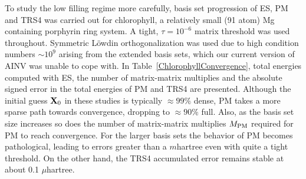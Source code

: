 \commentoutA{\documentclass[prl,aps,twocolumn,showpacs,twocolumngrid,superbib]{revtex4}}
\begin{document}
To study the low filling regime more carefully, basis set progression of ES, PM 
and TRS4 was carried out for chlorophyll, a relatively small (91 atom) Mg containing porphyrin ring system. 
A tight,  $\tau=10^{-6}$ matrix threshold was used throughout.  Symmetric L\"owdin orthogonalization 
was used due to high condition numbers $\sim 10^9$ arising from the extended basis sets, which 
our current version of AINV was unable to cope with.  In Table~\ref{ChlorophyllConvergence}, 
total energies computed with ES, the number of matrix-matrix multiplies and the absolute signed 
error in the total energies of PM and TRS4 are presented.  Although the initial guess ${\bf X}_0$ 
in these studies is typically $\approx 99\%$ dense, PM takes a more sparse path towards convergence, 
dropping to $\approx 90\%$ full.  Also, as the basis set size increases so does the number 
of matrix-matrix multiplies $M_{\rm PM}$ required for PM to reach convergence. For the 
larger basis sets the behavior of PM becomes pathological,  leading to errors greater 
than a $m$hartree even with quite a tight threshold.  On the other hand, the TRS4 accumulated error 
remains stable at about 0.1 $\mu$hartree.
\end{document}
